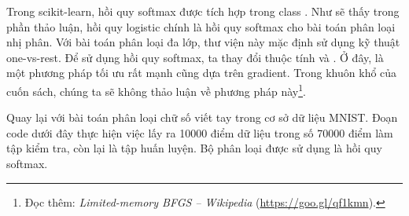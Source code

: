 Trong scikit-learn, hồi quy softmax được tích hợp trong class
. Như sẽ thấy trong phần
thảo luận, hồi quy logistic chính là hồi quy softmax cho bài toán phân loại nhị
phân. Với bài toán phân loại đa lớp, thư viện này mặc định sử dụng kỹ thuật
one-vs-rest. Để sử dụng hồi quy softmax, ta thay đổi thuộc tính
 và .
Ở đây,  là một phương pháp tối ưu rất mạnh cũng dựa trên
gradient. Trong khuôn khổ của cuốn sách, chúng ta sẽ không thảo luận về phương
pháp này\footnote{Đọc thêm: \textit{Limited-memory BFGS -- Wikipedia} (\url{https://goo.gl/qf1kmn}).}. 

Quay lại với bài toán phân loại chữ số viết tay trong cơ sở dữ liệu MNIST. Đoạn
code dưới đây thực hiện việc lấy ra 10000 điểm dữ liệu trong số 70000 điểm làm
tập kiểm tra, còn lại là tập huấn luyện. Bộ phân loại được sử dụng là hồi quy softmax.

 
 
 

